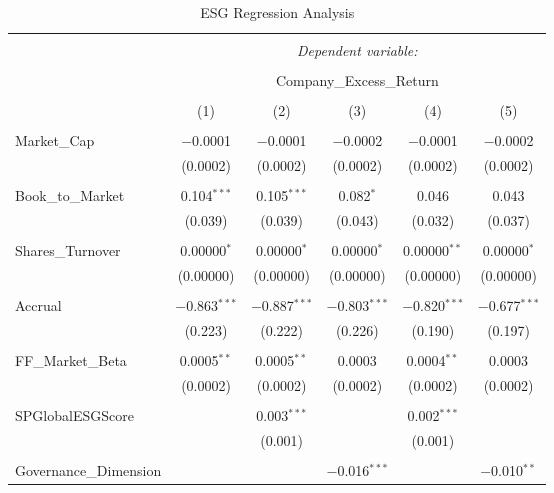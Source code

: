 
\begin{table}[!htbp] \centering 
  \caption{ESG Regression Analysis} 
  \label{} 
\begin{tabular}{@{\extracolsep{5pt}}lccccc} 
\\[-1.8ex]\hline 
\hline \\[-1.8ex] 
 & \multicolumn{5}{c}{\textit{Dependent variable:}} \\ 
\cline{2-6} 
\\[-1.8ex] & \multicolumn{5}{c}{Company\_Excess\_Return} \\ 
\\[-1.8ex] & (1) & (2) & (3) & (4) & (5)\\ 
\hline \\[-1.8ex] 
 Market\_Cap & $-$0.0001 & $-$0.0001 & $-$0.0002 & $-$0.0001 & $-$0.0002 \\ 
  & (0.0002) & (0.0002) & (0.0002) & (0.0002) & (0.0002) \\ 
  & & & & & \\ 
 Book\_to\_Market & 0.104$^{***}$ & 0.105$^{***}$ & 0.082$^{*}$ & 0.046 & 0.043 \\ 
  & (0.039) & (0.039) & (0.043) & (0.032) & (0.037) \\ 
  & & & & & \\ 
 Shares\_Turnover & 0.00000$^{*}$ & 0.00000$^{*}$ & 0.00000$^{*}$ & 0.00000$^{**}$ & 0.00000$^{*}$ \\ 
  & (0.00000) & (0.00000) & (0.00000) & (0.00000) & (0.00000) \\ 
  & & & & & \\ 
 Accrual & $-$0.863$^{***}$ & $-$0.887$^{***}$ & $-$0.803$^{***}$ & $-$0.820$^{***}$ & $-$0.677$^{***}$ \\ 
  & (0.223) & (0.222) & (0.226) & (0.190) & (0.197) \\ 
  & & & & & \\ 
 FF\_Market\_Beta & 0.0005$^{**}$ & 0.0005$^{**}$ & 0.0003 & 0.0004$^{**}$ & 0.0003 \\ 
  & (0.0002) & (0.0002) & (0.0002) & (0.0002) & (0.0002) \\ 
  & & & & & \\ 
 SPGlobalESGScore &  & 0.003$^{***}$ &  & 0.002$^{***}$ &  \\ 
  &  & (0.001) &  & (0.001) &  \\ 
  & & & & & \\ 
 Governance\_Dimension &  &  & $-$0.016$^{***}$ &  & $-$0.010$^{**}$ \\ 

\end{tabular}
\end{table}
